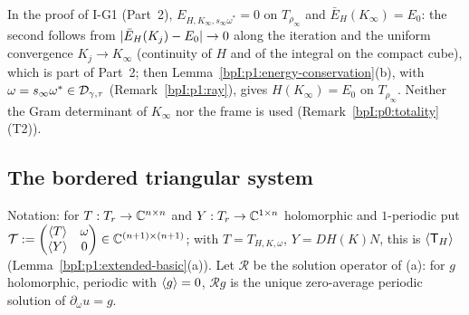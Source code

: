 \begin{remark}\label{bpI:p1:o3}
In the proof of I-G1 (Part~2), $E_{H,K_\infty,s_\infty\omega^*}=0$ on $T_{\rho_\infty}$ and $\bar E_H(K_\infty)=E_0$: the second follows
from $\lvert \bar E_{H}(K_j)-E_0\rvert\to0$ along the iteration and the uniform convergence $K_j\to K_\infty$ (continuity of $H$ and of the
integral on the compact cube), which is part of Part~2; then Lemma~\ref{bpI:p1:energy-conservation}(b), with $\omega=s_\infty\omega^*\in\mathcal{D}_{\gamma,\tau}$
(Remark~\ref{bpI:p1:ray}), gives $H(K_\infty)=E_0$ on $T_{\rho_\infty}$. Neither the Gram determinant of $K_\infty$ nor the frame
is used (Remark~\ref{bpI:p0:totality}(T2)).
\end{remark}

\subsection{The bordered triangular system}\label{bpI:p1:sec-border}

Notation: for $T:T_r\to\mathbb{C}^{n\times n}$ and $Y:T_r\to\mathbb{C}^{1\times n}$ holomorphic and $1$-periodic put
$\mathcal T:=\begin{pmatrix}\langle T\rangle&\omega\\ \langle Y\rangle&0\end{pmatrix}\in\mathbb{C}^{(n+1)\times(n+1)}$; with $T=T_{H,K,\omega}$,
$Y=DH(K)N$, this is $\langle \mathsf T_H\rangle$ (Lemma~\ref{bpI:p1:extended-basic}(a)). Let $\mathcal R$ be the solution operator of
(a): for $g$ holomorphic, periodic with $\langle g\rangle=0$, $\mathcal Rg$ is the unique zero-average
periodic solution of $\partial_\omega u=g$.


